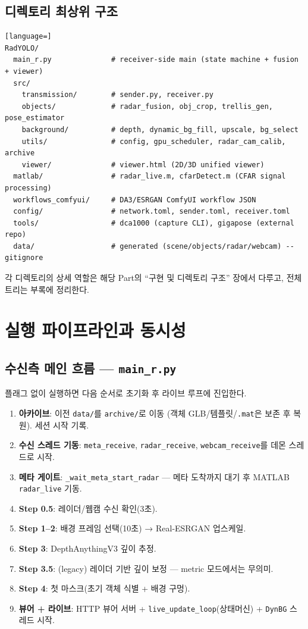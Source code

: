\section{디렉토리 최상위 구조}
\begin{lstlisting}[language=]
RadYOLO/
  main_r.py              # receiver-side main (state machine + fusion + viewer)
  src/
    transmission/        # sender.py, receiver.py
    objects/             # radar_fusion, obj_crop, trellis_gen, pose_estimator
    background/          # depth, dynamic_bg_fill, upscale, bg_select
    utils/               # config, gpu_scheduler, radar_cam_calib, archive
    viewer/              # viewer.html (2D/3D unified viewer)
  matlab/                # radar_live.m, cfarDetect.m (CFAR signal processing)
  workflows_comfyui/     # DA3/ESRGAN ComfyUI workflow JSON
  config/                # network.toml, sender.toml, receiver.toml
  tools/                 # dca1000 (capture CLI), gigapose (external repo)
  data/                  # generated (scene/objects/radar/webcam) -- gitignore
\end{lstlisting}
각 디렉토리의 상세 역할은 해당 Part의 ``구현 및 디렉토리 구조'' 장에서 다루고,
전체 트리는 부록에 정리한다.

\chapter{실행 파이프라인과 동시성}

\section{수신측 메인 흐름 — \texttt{main\_r.py}}
플래그 없이 실행하면 다음 순서로 초기화 후 라이브 루프에 진입한다.
\begin{enumerate}
  \item \textbf{아카이브}: 이전 \texttt{data/}를 \texttt{archive/}로 이동
        (객체 GLB/템플릿/\texttt{.mat}은 보존 후 복원). 세션 시작 기록.
  \item \textbf{수신 스레드 기동}: \texttt{meta\_receive}, \texttt{radar\_receive},
        \texttt{webcam\_receive}를 데몬 스레드로 시작.
  \item \textbf{메타 게이트}: \texttt{\_wait\_meta\_start\_radar} — 메타 도착까지 대기
        후 MATLAB \texttt{radar\_live} 기동.
  \item \textbf{Step 0.5}: 레이더/웹캠 수신 확인(3초).
  \item \textbf{Step 1--2}: 배경 프레임 선택(10초) → Real-ESRGAN 업스케일.
  \item \textbf{Step 3}: DepthAnythingV3 깊이 추정.
  \item \textbf{Step 3.5}: (legacy) 레이더 기반 깊이 보정 — metric 모드에서는 무의미.
  \item \textbf{Step 4}: 첫 마스크(초기 객체 식별 + 배경 구멍).
  \item \textbf{뷰어 + 라이브}: HTTP 뷰어 서버 + \texttt{live\_update\_loop}(상태머신) +
        \texttt{DynBG} 스레드 시작.
\end{enumerate}

